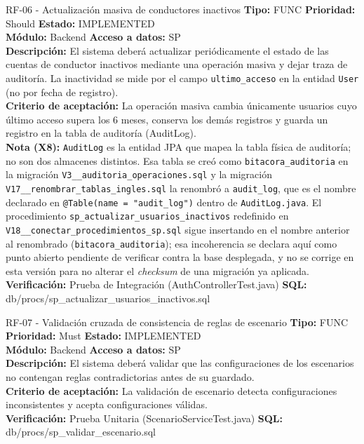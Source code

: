 \documentclass[11pt,a4paper]{article}
\begin{document}
\begin{requisito}{RF-06 - Actualización masiva de conductores inactivos}
    \textbf{Tipo:} FUNC \quad \textbf{Prioridad:} Should \quad \textbf{Estado:} IMPLEMENTED \\[0.2cm]
    \textbf{Módulo:} Backend \quad \textbf{Acceso a datos:} SP \\[0.2cm]
    \textbf{Descripción:} El sistema deberá actualizar periódicamente el estado de las cuentas de conductor inactivos mediante una operación masiva y dejar traza de auditoría. La inactividad se mide por el campo \texttt{ultimo\_acceso} en la entidad \texttt{User} (no por fecha de registro). \\[0.2cm]
    \textbf{Criterio de aceptación:} La operación masiva cambia únicamente usuarios cuyo último acceso supera los 6 meses, conserva los demás registros y guarda un registro en la tabla de auditoría (AuditLog). \\[0.2cm]
    \textbf{Nota (X8):} \texttt{AuditLog} es la entidad JPA que mapea la tabla física de auditoría; no son dos almacenes distintos. Esa tabla se creó como \texttt{bitacora\_auditoria} en la migración \texttt{V3\_\_auditoria\_operaciones.sql} y la migración \texttt{V17\_\_renombrar\_tablas\_ingles.sql} la renombró a \texttt{audit\_log}, que es el nombre declarado en \texttt{@Table(name = "audit\_log")} dentro de \texttt{AuditLog.java}. El procedimiento \texttt{sp\_actualizar\_usuarios\_inactivos} redefinido en \texttt{V18\_\_conectar\_procedimientos\_sp.sql} sigue insertando en el nombre anterior al renombrado (\texttt{bitacora\_auditoria}); esa incoherencia se declara aquí como punto abierto pendiente de verificar contra la base desplegada, y no se corrige en esta versión para no alterar el \textit{checksum} de una migración ya aplicada. \\[0.2cm]
    \textbf{Verificación:} Prueba de Integración (AuthControllerTest.java) \quad \textbf{SQL:} db/procs/sp\_actualizar\_usuarios\_inactivos.sql
\end{requisito}

\begin{requisito}{RF-07 - Validación cruzada de consistencia de reglas de escenario}
    \textbf{Tipo:} FUNC \quad \textbf{Prioridad:} Must \quad \textbf{Estado:} IMPLEMENTED \\[0.2cm]
    \textbf{Módulo:} Backend \quad \textbf{Acceso a datos:} SP \\[0.2cm]
    \textbf{Descripción:} El sistema deberá validar que las configuraciones de los escenarios no contengan reglas contradictorias antes de su guardado. \\[0.2cm]
    \textbf{Criterio de aceptación:} La validación de escenario detecta configuraciones inconsistentes y acepta configuraciones válidas. \\[0.2cm]
    \textbf{Verificación:} Prueba Unitaria (ScenarioServiceTest.java) \quad \textbf{SQL:} db/procs/sp\_validar\_escenario.sql
\end{requisito}
\end{document}

